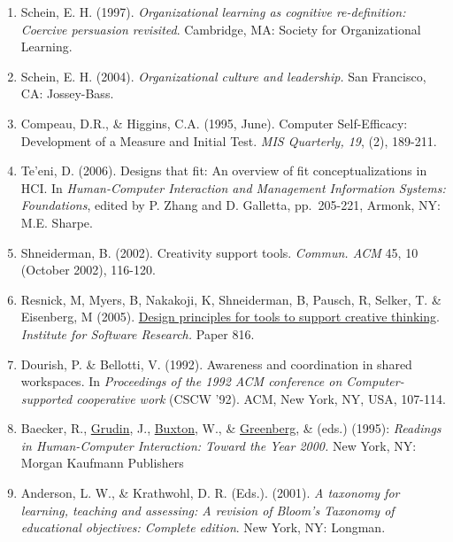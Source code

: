 \begin{enumerate}
\def\labelenumi{\arabic{enumi}.}
\item
  Schein, E. H. (1997). \emph{Organizational learning as cognitive
  re-definition: Coercive persuasion revisited}. Cambridge, MA: Society
  for Organizational Learning.
\item
  Schein, E. H. (2004). \emph{Organizational culture and leadership.}
  San Francisco, CA: Jossey-Bass.
\item
  Compeau, D.R., \& Higgins, C.A. (1995, June). Computer Self-Efficacy:
  Development of a Measure and Initial Test. \emph{MIS Quarterly, 19},
  (2), 189-211.
\item
  Te'eni, D. (2006). Designs that fit: An overview of fit
  conceptualizations in HCI. In \emph{Human-Computer Interaction and
  Management Information Systems: Foundations}, edited by P. Zhang and
  D. Galletta, pp.~205-221, Armonk, NY: M.E. Sharpe.
\item
  Shneiderman, B. (2002). Creativity support tools. \emph{Commun. ACM}
  45, 10 (October 2002), 116-120.
\item
  Resnick, M, Myers, B, Nakakoji, K, Shneiderman, B, Pausch, R, Selker,
  T. \& Eisenberg, M (2005).
  \href{http://repository.cmu.edu/isr/816}{Design principles for tools
  to support creative thinking}. \emph{Institute for Software Research.}
  Paper 816.
\item
  Dourish, P. \& Bellotti, V. (1992). Awareness and coordination in
  shared workspaces. In \emph{Proceedings of the 1992 ACM conference on
  Computer-supported cooperative work} (CSCW '92). ACM, New York, NY,
  USA, 107-114.
\item
  Baecker, R.,
  \href{http://www.interaction-design.org/references/authors/jonathan_grudin.html}{Grudin},
  J.,
  \href{http://www.interaction-design.org/references/authors/william_buxton.html}{Buxton},
  W., \&
  \href{http://www.interaction-design.org/references/authors/saul_greenberg.html}{Greenberg},
  \& (eds.) (1995): \emph{Readings in Human-Computer Interaction: Toward
  the Year 2000.} New York, NY: Morgan Kaufmann Publishers
\item
  Anderson, L. W., \& Krathwohl, D. R. (Eds.). (2001). \emph{A taxonomy
  for learning, teaching and assessing: A revision of Bloom's Taxonomy
  of educational objectives: Complete edition}. New York, NY: Longman.
\end{enumerate}
